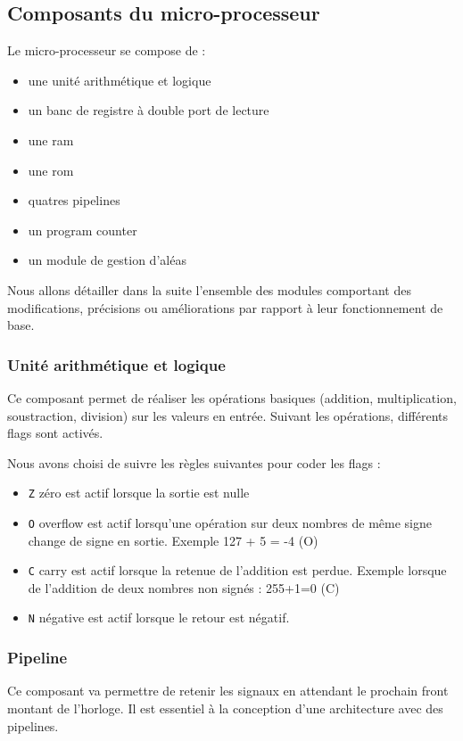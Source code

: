 \subsection{Composants du micro-processeur}
Le micro-processeur se compose de :
\begin{itemize}
\item une unité arithmétique et logique
\item un banc de registre à double port de lecture
\item une ram
\item une rom
\item quatres pipelines
\item un program counter
\item un module de gestion d'aléas
\end{itemize}
Nous allons détailler dans la suite l'ensemble des modules comportant des modifications, précisions ou améliorations par rapport à leur fonctionnement de base.

\subsubsection{Unité arithmétique et logique}
Ce composant permet de réaliser les opérations basiques (addition, multiplication, soustraction, division) sur les valeurs en entrée. Suivant les opérations, différents flags sont activés. 

Nous avons choisi de suivre les règles suivantes pour coder les flags  : 
\begin{itemize}
\item \texttt{Z} zéro est actif lorsque la sortie est nulle
\item \texttt{O} overflow est actif lorsqu'une opération sur deux nombres de même signe change de signe en sortie. Exemple 127 + 5 = -4 (O)
\item \texttt{C} carry est actif lorsque la retenue de l'addition est perdue. Exemple lorsque de l'addition de deux nombres non signés : 255+1=0 (C)
\item \texttt{N} négative est actif lorsque le retour est négatif.
\end{itemize}

\subsubsection{Pipeline}
Ce composant va permettre de retenir les signaux en attendant le prochain front montant de l'horloge. Il est essentiel à la conception d'une architecture avec des pipelines. 

